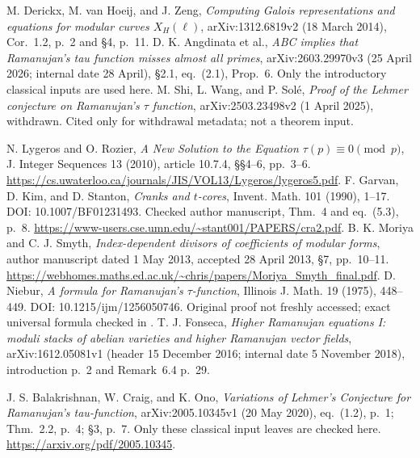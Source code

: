  M. Derickx, M. van Hoeij, and J. Zeng, \emph{Computing Galois representations and equations for modular curves $X_H(\ell)$}, arXiv:1312.6819v2 (18 March 2014), Cor.~1.2, p.~2 and \S4, p.~11.
 D. K. Angdinata et al., \emph{ABC implies that Ramanujan's tau function misses almost all primes}, arXiv:2603.29970v3 (25 April 2026; internal date 28 April), \S2.1, eq.~(2.1), Prop.~6. Only the introductory classical inputs are used here.
 M. Shi, L. Wang, and P. Sol\'e, \emph{Proof of the Lehmer conjecture on Ramanujan's $\tau$ function}, arXiv:2503.23498v2 (1 April 2025), withdrawn. Cited only for withdrawal metadata; not a theorem input.

 N. Lygeros and O. Rozier, \emph{A New Solution to the Equation $\tau(p)\equiv0\pmod p$}, J. Integer Sequences 13 (2010), article 10.7.4, \S\S4--6, pp.~3--6. \url{https://cs.uwaterloo.ca/journals/JIS/VOL13/Lygeros/lygeros5.pdf}.
 F. Garvan, D. Kim, and D. Stanton, \emph{Cranks and $t$-cores}, Invent. Math. 101 (1990), 1--17. DOI: 10.1007/BF01231493. Checked author manuscript, Thm.~4 and eq.~(5.3), p.~8. \url{https://www-users.cse.umn.edu/~stant001/PAPERS/cra2.pdf}.
 B. K. Moriya and C. J. Smyth, \emph{Index-dependent divisors of coefficients of modular forms}, author manuscript dated 1 May 2013, accepted 28 April 2013, \S7, pp.~10--11. \url{https://webhomes.maths.ed.ac.uk/~chris/papers/Moriya_Smyth_final.pdf}.
 D. Niebur, \emph{A formula for Ramanujan's $\tau$-function}, Illinois J. Math. 19 (1975), 448--449. DOI: 10.1215/ijm/1256050746. Original proof not freshly accessed; exact universal formula checked in \cite{MoriyaSmyth}.
 T. J. Fonseca, \emph{Higher Ramanujan equations I: moduli stacks of abelian varieties and higher Ramanujan vector fields}, arXiv:1612.05081v1 (header 15 December 2016; internal date 5 November 2018), introduction p.~2 and Remark~6.4 p.~29.

 J. S. Balakrishnan, W. Craig, and K. Ono, \emph{Variations of Lehmer's Conjecture for Ramanujan's tau-function}, arXiv:2005.10345v1 (20 May 2020), eq.~(1.2), p.~1; Thm.~2.2, p.~4; \S3, p.~7. Only these classical input leaves are checked here. \url{https://arxiv.org/pdf/2005.10345}.
